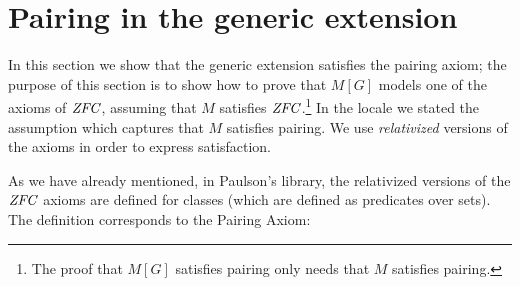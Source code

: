 \section{Pairing in the generic extension}
\label{sec:pairing-generic-extension}

In this section we show that the generic extension satisfies the
pairing axiom; the purpose of this section is to show how to prove
that $M[G]$ models one of the axioms of $\mathit{ZFC}$, assuming that $M$
satisfies $\mathit{ZFC}$.\footnote{The proof that $M[G]$ satisfies pairing
  only needs that $M$ satisfies pairing.} In the locale
 we stated
the assumption  which captures that
$M$ satisfies pairing. We use \emph{relativized} versions of the axioms
in order to express satisfaction.


As we have already mentioned, in Paulson's library, the relativized
versions of the $\mathit{ZFC}$ axioms are defined for classes (which are
defined as predicates over sets). The definition
 corresponds to the Pairing Axiom:

